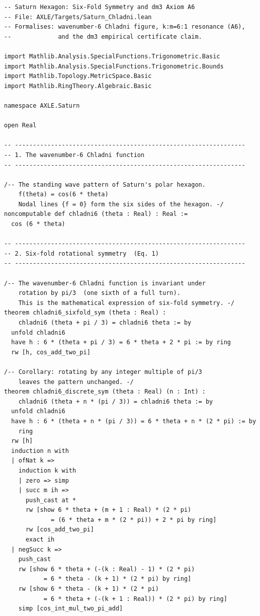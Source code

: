 \documentclass[11pt, a4paper]{article}
\theoremstyle{definition}
\begin{document}
\begin{lstlisting}[language=Lean4,
  caption={Saturn hexagon --- six-fold symmetry and dm$^3$ Axiom A6 in Lean 4
           (AXLE/Targets/Saturn\_Chladni.lean)},
  label={lst:lean-saturn}]
-- Saturn Hexagon: Six-Fold Symmetry and dm3 Axiom A6
-- File: AXLE/Targets/Saturn_Chladni.lean
-- Formalises: wavenumber-6 Chladni figure, k:m=6:1 resonance (A6),
--             and the dm3 empirical certificate claim.

import Mathlib.Analysis.SpecialFunctions.Trigonometric.Basic
import Mathlib.Analysis.SpecialFunctions.Trigonometric.Bounds
import Mathlib.Topology.MetricSpace.Basic
import Mathlib.RingTheory.Algebraic.Basic

namespace AXLE.Saturn

open Real

-- ----------------------------------------------------------------
-- 1. The wavenumber-6 Chladni function
-- ----------------------------------------------------------------

/-- The standing wave pattern of Saturn's polar hexagon.
    f(theta) = cos(6 * theta)
    Nodal lines {f = 0} form the six sides of the hexagon. -/
noncomputable def chladni6 (theta : Real) : Real :=
  cos (6 * theta)

-- ----------------------------------------------------------------
-- 2. Six-fold rotational symmetry  (Eq. 1)
-- ----------------------------------------------------------------

/-- The wavenumber-6 Chladni function is invariant under
    rotation by pi/3  (one sixth of a full turn).
    This is the mathematical expression of six-fold symmetry. -/
theorem chladni6_sixfold_sym (theta : Real) :
    chladni6 (theta + pi / 3) = chladni6 theta := by
  unfold chladni6
  have h : 6 * (theta + pi / 3) = 6 * theta + 2 * pi := by ring
  rw [h, cos_add_two_pi]

/-- Corollary: rotating by any integer multiple of pi/3
    leaves the pattern unchanged. -/
theorem chladni6_discrete_sym (theta : Real) (n : Int) :
    chladni6 (theta + n * (pi / 3)) = chladni6 theta := by
  unfold chladni6
  have h : 6 * (theta + n * (pi / 3)) = 6 * theta + n * (2 * pi) := by
    ring
  rw [h]
  induction n with
  | ofNat k =>
    induction k with
    | zero => simp
    | succ m ih =>
      push_cast at *
      rw [show 6 * theta + (m + 1 : Real) * (2 * pi)
             = (6 * theta + m * (2 * pi)) + 2 * pi by ring]
      rw [cos_add_two_pi]
      exact ih
  | negSucc k =>
    push_cast
    rw [show 6 * theta + (-(k : Real) - 1) * (2 * pi)
           = 6 * theta - (k + 1) * (2 * pi) by ring]
    rw [show 6 * theta - (k + 1) * (2 * pi)
           = 6 * theta + (-(k + 1 : Real)) * (2 * pi) by ring]
    simp [cos_int_mul_two_pi_add]


\end{lstlisting}
\end{document}
